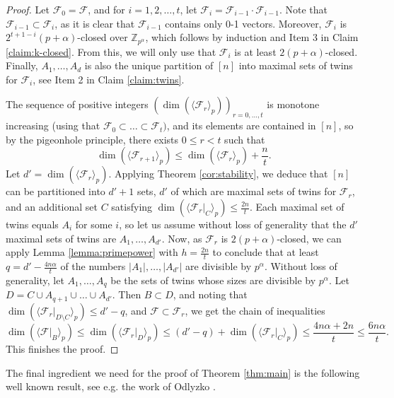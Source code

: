 	\begin{proof}
		Let $\mathcal{F}_0=\mathcal{F}$, and for $i=1,2,\dots,t$, let $\mathcal{F}_{i}=\mathcal{F}_{i-1}\cdot\mathcal{F}_{i-1}$. Note that $\mathcal{F}_{i-1} \subset \mathcal{F}_i$, as it is clear that $\mathcal{F}_{i-1}$ contains only 0-1 vectors. Moreover, $\mathcal{F}_i$ is $2^{t+1-i}(p+\alpha)$-closed over $\mathbb{Z}_{p^{\alpha}}$, which follows by induction and Item 3 in Claim \ref{claim:k-closed}. From this, we will only use that $\mathcal{F}_i$ is at least $2(p+\alpha)$-closed. Finally, $A_1,\dots,A_d$ is also the unique partition of $[n]$ into maximal sets of twins for $\mathcal{F}_i$, see Item 2 in Claim \ref{claim:twins}.
		
		The sequence of positive integers $(\dim(\langle \mathcal{F}_r\rangle_p))_{r=0,\dots,t}$ is monotone increasing (using that $\mathcal{F}_{0}\subset\dots\subset \mathcal{F}_{t})$, and its elements are contained in $[n]$, so by the pigeonhole principle, there exists $0\leq r<t$ such that 
		$$\dim(\langle\mathcal{F}_{r+1} \rangle_{p})\leq \dim(\langle\mathcal{F}_r\rangle_{p})+\frac{n}{t}.$$
		Let $d'=\dim(\langle\mathcal{F}_r\rangle_{p})$. Applying Theorem \ref{cor:stability}, we deduce that $[n]$ can be partitioned into
%
        $d'+1$ sets, $d'$ of which are maximal sets of twins for $\mathcal{F}_r$, and an additional set $C$ satisfying $\dim(\langle \mathcal{F}_r|_{C}\rangle_p)\leq \frac{2n}{t}$. Each maximal set of twins equals $A_i$ for some $i$, so let us assume without loss of generality that the $d'$ maximal sets of twins are $A_1,\dots,A_{d'}$.
		Now, as $\mathcal{F}_{r}$ is $2(p+\alpha)$-closed, we can apply Lemma \ref{lemma:primepower} with $h =  \frac{2n}{t}$ to conclude that at least $q=d'-\frac{4n\alpha}{t}$ of the numbers $|A_{1}|,\dots,|A_{d'}|$ are divisible by $p^{\alpha}$. Without loss of generality, let $A_1,\dots,A_q$ be the sets of twins whose sizes are divisible by $p^{\alpha}$. Let $D=C\cup A_{q+1}\cup\dots\cup A_{d'}$. Then $B\subset D$, and noting that $\dim(\langle\mathcal{F}_r|_{D\setminus C}\rangle_p)\leq d'-q$, and  $\mathcal{F}\subset \mathcal{F}_r$, we get the chain of inequalities $$\dim(\langle \mathcal{F}|_{B}\rangle_p)\leq \dim(\langle \mathcal{F}_{r}|_{D}\rangle_p)\leq (d'-q)+\dim(\langle \mathcal{F}_r|_{C}\rangle_p)\leq \frac{4n\alpha+2n}{t} \leq \frac{6n\alpha}{t}.$$ 
		This finishes the proof.
	\end{proof}
	
	The final ingredient we need for the proof of Theorem \ref{thm:main} is the following well known result, see e.g. the work of Odlyzko \cite{O81}.
	
